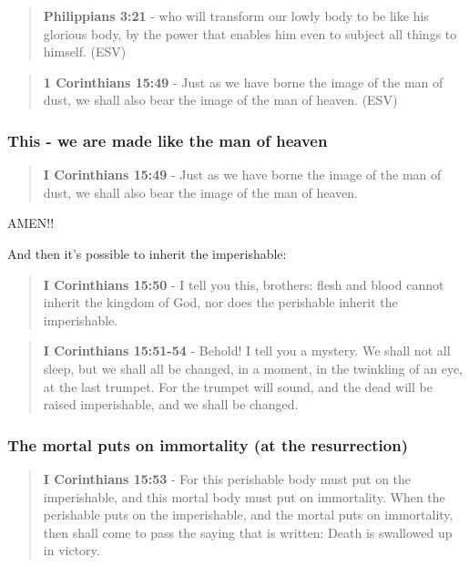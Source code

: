 \documentclass[11pt]{article}
\begin{document}
\begin{quote}
\textbf{Philippians 3:21} -  who will transform our lowly body to be like his glorious body, by the power that enables him even to subject all things to himself.  (ESV)
\end{quote}

\begin{quote}
\textbf{1 Corinthians 15:49} -  Just as we have borne the image of the man of dust, we shall also bear the image of the man of heaven.  (ESV)
\end{quote}

\subsubsection{This - we are made like the man of heaven}
\label{sec:orga0450e7}
\begin{quote}
\textbf{I Corinthians 15:49} - Just as we have borne the image of the man of dust, we shall also bear the image of the man of heaven.
\end{quote}

AMEN!!

And then it's possible to inherit the imperishable:

\begin{quote}
\textbf{I Corinthians 15:50} - I tell you this, brothers: flesh and blood cannot inherit the kingdom of God, nor does the perishable inherit the imperishable.
\end{quote}

\begin{quote}
\textbf{I Corinthians 15:51-54} - Behold! I tell you a mystery. We shall not all sleep, but we shall all be changed, in a moment, in the twinkling of an eye, at the last trumpet. For the trumpet will sound, and the dead will be raised imperishable, and we shall be changed.
\end{quote}

\subsubsection{The mortal puts on immortality (at the resurrection)}
\label{sec:org7ba1da5}
\begin{quote}
\textbf{I Corinthians 15:53} - For this perishable body must put on the imperishable, and this mortal body must put on immortality. When the perishable puts on the imperishable, and the mortal puts on immortality, then shall come to pass the saying that is written: Death is swallowed up in victory.
\end{quote}
\end{document}
